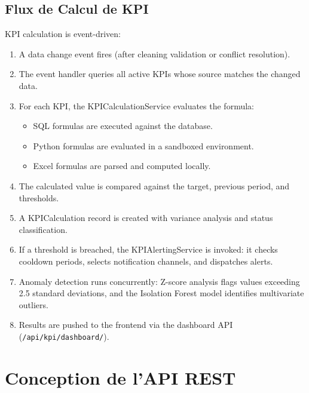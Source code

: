 \subsection{Flux de Calcul de KPI}

\noindent
KPI calculation is event-driven:

\begin{enumerate}
  \item A data change event fires
        (after cleaning validation or conflict resolution).
  \item The event handler queries all active KPIs
        whose source matches the changed data.
  \item For each KPI, the KPICalculationService
        evaluates the formula:
        \begin{itemize}
          \item SQL formulas are executed
                against the database.
          \item Python formulas are evaluated
                in a sandboxed environment.
          \item Excel formulas are parsed
                and computed locally.
        \end{itemize}
  \item The calculated value is compared against
        the target, previous period, and thresholds.
  \item A KPICalculation record is created
        with variance analysis and status classification.
  \item If a threshold is breached,
        the KPIAlertingService is invoked:
        it checks cooldown periods,
        selects notification channels,
        and dispatches alerts.
  \item Anomaly detection runs concurrently:
        Z-score analysis flags values
        exceeding 2.5 standard deviations,
        and the Isolation Forest model
        identifies multivariate outliers.
  \item Results are pushed to the frontend
        via the dashboard API
        (\texttt{/api/kpi/dashboard/}).
\end{enumerate}


\section{Conception de l'API REST}


